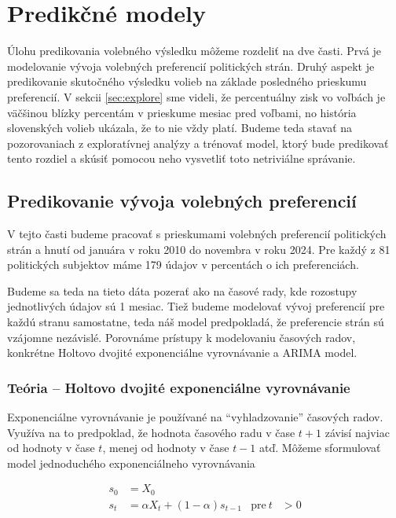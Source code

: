 \documentclass[report.tex]{subfiles}
\begin{document}
	
\section{Predikčné modely}	
\label{sec:models}

Úlohu predikovania volebného výsledku môžeme rozdeliť na dve časti. Prvá je modelovanie vývoja volebných preferencií politických strán. Druhý aspekt je predikovanie skutočného výsledku volieb na základe posledného prieskumu preferencií. V sekcii \ref{sec:explore} sme videli, že percentuálny zisk vo voľbách je väčšinou blízky percentám v prieskume mesiac pred voľbami, no história slovenských volieb ukázala, že to nie vždy platí. Budeme teda stavať na pozorovaniach z exploratívnej analýzy a trénovať model, ktorý bude predikovať tento rozdiel a skúsiť pomocou neho vysvetliť toto netriviálne správanie. 

\subsection{Predikovanie vývoja volebných preferencií}

V tejto časti budeme pracovať s prieskumami volebných preferencií politických strán a hnutí od januára v roku 2010 do novembra v roku 2024. Pre každý z 81 politických subjektov máme 179 údajov v percentách o ich preferenciách. 

Budeme sa teda na tieto dáta pozerať ako na časové rady, kde rozostupy jednotlivých údajov sú 1 mesiac. Tiež budeme modelovať vývoj preferencií pre každú stranu samostatne, teda náš model predpokladá, že preferencie strán sú vzájomne nezávislé. Porovnáme prístupy k modelovaniu časových radov, konkrétne Holtovo dvojité exponenciálne vyrovnávanie a ARIMA model.


\subsubsection{Teória -- Holtovo dvojité exponenciálne vyrovnávanie} 

Exponenciálne vyrovnávanie je používané na \enquote{vyhladzovanie} časových radov. Využíva na to predpoklad, že hodnota časového radu v čase $t+1$ závisí najviac od hodnoty v čase $t$, menej od hodnoty v čase $t-1$ atď. Môžeme sformulovať model jednoduchého exponenciálneho vyrovnávania

\begin{align*}
	s_0 &= X_0 \\
	s_t &= \alpha X_t + (1-\alpha) s_{t-1}  & \text{pre}~t&>0 
\end{align*}
\end{document}
